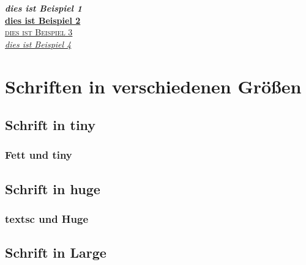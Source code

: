 \documentclass{article}
\begin{document}
\textbf{\textit{dies ist Beispiel 1 }} \\ 
\textbf{\underline{dies ist Beispiel 2 }} \\
\underline{\textsc{dies ist Beispiel 3 }} \\
\underline{\textit{dies ist Beispiel 4 }} \\

\newpage

\section{Schriften in verschiedenen Größen}

\subsection{Schrift in tiny}
\begin{tiny}
\blindtext
\end{tiny}

\subsubsection{Fett und tiny}

\begin{tiny}
\begin{textbf}
\blindtext
\end{textbf}
\end{tiny}

\subsection{Schrift in huge}

\begin{huge}
\blindtext
\end{huge}

\subsubsection{textsc und Huge}

\begin{huge}
\begin{textsc}
\blindtext
\end{textsc}
\end{huge}

\subsection{Schrift in Large}
\end{document}

